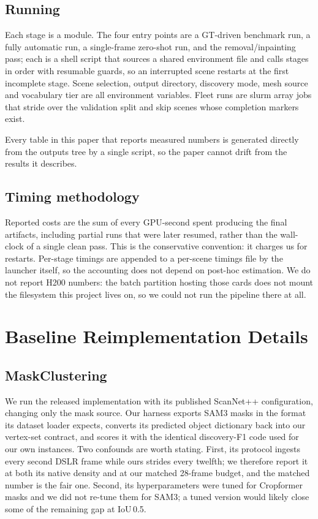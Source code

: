 \subsection{Running}
Each stage is a module. The four entry points are a GT-driven benchmark
run, a fully automatic run, a single-frame zero-shot run, and the
removal/inpainting pass; each is a shell script that sources a shared
environment file and calls stages in order with resumable guards, so an
interrupted scene restarts at the first incomplete stage. Scene selection,
output directory, discovery mode, mesh source and vocabulary tier are all
environment variables. Fleet runs are slurm array jobs that stride over
the validation split and skip scenes whose completion markers exist.

Every table in this paper that reports measured numbers is generated
directly from the outputs tree by a single script, so the paper cannot
drift from the results it describes.

\subsection{Timing methodology}
Reported costs are the sum of every GPU-second spent producing the final
artifacts, including partial runs that were later resumed, rather than the
wall-clock of a single clean pass. This is the conservative convention: it
charges us for restarts. Per-stage timings are appended to a per-scene
timings file by the launcher itself, so the accounting does not depend on
post-hoc estimation. We do not report H200 numbers: the batch partition
hosting those cards does not mount the filesystem this project lives on,
so we could not run the pipeline there at all.

\section{Baseline Reimplementation Details}
\label{app:baselines}

\subsection{MaskClustering}
We run the released implementation with its published ScanNet++
configuration, changing only the mask source. Our harness exports SAM3
masks in the format its dataset loader expects, converts its predicted
object dictionary back into our vertex-set contract, and scores it with
the identical discovery-F1 code used for our own instances. Two
confounds are worth stating. First, its protocol ingests every second
DSLR frame while ours strides every twelfth; we therefore report it at
both its native density and at our matched 28-frame budget, and the
matched number is the fair one. Second, its hyperparameters were tuned
for Cropformer masks and we did not re-tune them for SAM3; a tuned
version would likely close some of the remaining gap at IoU\,0.5.

